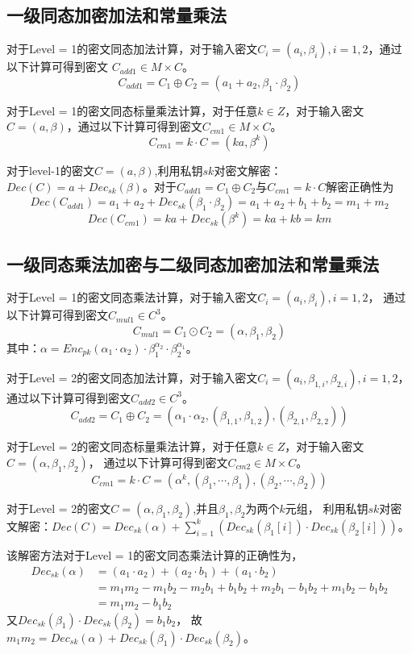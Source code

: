 \documentclass[12pt, a4paper, oneside]{ctexart}
\begin{document}
\subsection{一级同态加密加法和常量乘法}
对于Level = 1的密文同态加法计算，对于输入密文$C_i=\left (a_i,\beta_i\right ),i=1,2$，通过以下计算可得到密文 $C_{add1}\in M\times C$。
$$C_{add1}=C_1\oplus C_2=(a_1+a_2,\beta_1\cdot\beta_2)$$
\par
对于Level = 1的密文同态标量乘法计算，对于任意$k\in Z$，对于输入密文$C=\left (a,\beta\right )$，通过以下计算可得到密文$C_{cm1}\in M\times C$。
$$C_{cm1}=k\cdot C=\left (ka,\beta ^k\right )$$
\par
对于level-1的密文$C=\left (a,\beta\right )$,利用私钥$sk$对密文解密：$Dec\left (C\right )=a+Dec_{sk}\left (\beta\right )$。对于$C_{add1}=C_1\oplus C_2$与$C_{cm1}=k\cdot C$解密正确性为
$$Dec\left (C_{add1}\right )=a_1+a_2+Dec_{sk}\left (\beta_1\cdot\beta_2\right )=a_1+a_2+b_1+b_2=m_1+m_2$$
$$Dec\left (C_{cm1}\right )=ka+Dec_{sk}\left (\beta^k\right )=ka+kb=km$$

\subsection{一级同态乘法加密与二级同态加密加法和常量乘法}
对于Level = 1的密文同态乘法计算，对于输入密文$C_i=\left (a_i,\beta_i\right ),i=1,2$，
通过以下计算可得到密文$C_{mul1}\in C^3$。
$$C_{mul1}=C_1\odot C_2 = (\alpha ,\beta_1,\beta_2)$$
其中：$\alpha = Enc_{pk}(\alpha_1\cdot \alpha_2)\cdot \beta_1^{\alpha_2}\cdot \beta_2^{\alpha_1}$。

对于Level = 2的密文同态加法计算，对于输入密文$C_i=\left (a_i,\beta_{1,i},\beta_{2,i}\right ),i=1,2$，
通过以下计算可得到密文$C_{add2}\in C^3$。
$$C_{add2} =  C_1\oplus C_2=(\alpha_1\cdot \alpha_2,(\beta_{1,1},\beta_{1,2}),(\beta_{2,1},\beta_{2,2}))$$

对于Level = 2的密文同态标量乘法计算，对于任意$k\in Z$，对于输入密文$C=\left (\alpha,\beta_1,\beta_2\right )$，
通过以下计算可得到密文$C_{cm2}\in M\times C$。
$$C_{cm1}=k\cdot C=\left (\alpha^k,(\beta_{1},\cdots,\beta_{1}),(\beta_{2},\cdots,\beta_{2})\right )$$

对于Level = 2的密文$C=\left (\alpha,\beta_1,\beta_2\right )$,并且$\beta_1,\beta_2$为两个$k$元组，
利用私钥$sk$对密文解密：$Dec(C) = Dec_{sk}(\alpha)+ \sum_{i=1}^{k}(Dec_{sk}(\beta_1[i])\cdot Dec_{sk}(\beta_2[i]))$。

该解密方法对于Level = 1的密文同态乘法计算的正确性为，
\begin{equation}\label{alpha}
    \begin{split}
        Dec_{sk}(\alpha) &= (a_1\cdot a_2)+(a_2\cdot b_1)+(a_1\cdot b_2)\\
        &= m_1m_2-m_1b_2-m_2b_1+b_1b_2+m_2b_1-b_1b_2+m_1b_2-b_1b_2\\
        &= m_1m_2-b_1b_2
    \end{split}
\end{equation}
又$ Dec_{sk}(\beta_1)\cdot Dec_{sk}(\beta_2) = b_1b_2$，
故$m_1m_2 = Dec_{sk}(\alpha) +Dec_{sk}(\beta_1)\cdot Dec_{sk}(\beta_2)$。
\end{document}
